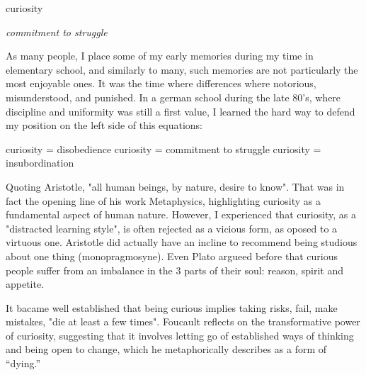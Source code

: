 


\begin{center}
\vspace*{\fill}
\Huge curiosity

\vspace{2cm}

\begin{flushright}
\large
\textit{commitment to struggle}
\end{flushright}

\vspace*{\fill}
\end{center}

\normalsize

As many people, I place some of my early memories during my time in elementary school, and similarly to many, such memories are not particularly the most enjoyable ones. It was the time where differences where notorious, misunderstood, and punished. In a german school during the late 80's, where discipline and uniformity was still a first value, I learned the hard way to defend my position on the left side of this equations: 

curiosity = disobedience
curiosity = commitment to struggle %
curiosity = insubordination

Quoting Aristotle, "all human beings, by nature, desire to know". That was in fact the opening line of his work Metaphysics, highlighting curiosity as a fundamental aspect of human nature.  However, I experienced that curiosity, as a "distracted learning style", is often rejected as a vicious form, as oposed to a virtuous one. Aristotle did actually have an incline to recommend being studious about one thing (monopragmosyne). Even Plato argueed before that curious people suffer from an imbalance in the 3 parts of their soul: reason, spirit and appetite. \citep{perry}

It bacame well established that being curious implies taking risks, fail, make mistakes, "die at least a few times". \citep{foucault1980masked} Foucault reflects on the transformative power of curiosity, suggesting that it involves letting go of established ways of thinking and being open to change, which he metaphorically describes as a form of “dying.”



